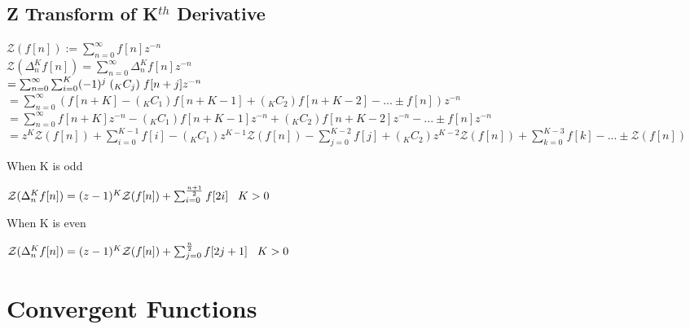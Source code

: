 \documentclass[11pt]{article}
\begin{document}
\subsection{Z Transform of K$^{th}$ Derivative}
\vspace{1mm}
\begin{center}
$
\mathcal{Z}(f[n]) := \sum_{n=0}^{\infty}f[n]z^{-n}
$
\\ \vspace{5mm}
$
\mathcal{Z}(\Delta_n^K f[n]) = \sum_{n=0}^{\infty} \Delta_n^K f[n]z^{-n}
$
\\ \vspace{5mm}
$
= \sum_{n=0}^{\infty} \sum_{i=0}^K (-1)^{j} \hspace{1mm} (_K C _j) \hspace{1mm} f[n + j] z^{-n}
$
\\ \vspace{5mm}
$
= \sum_{n=0}^{\infty} (f[n+K] - (_K C _1) f[n+K-1] +  (_K C _2) f[n+K-2] - ...\pm f[n])z^{-n}
$
\\ \vspace{5mm}
$
= \sum_{n=0}^{\infty} f[n+K]z^{-n} - (_K C _1) f[n+K-1]z^{-n} +  (_K C _2) f[n+K-2]z^{-n} - ...\pm f[n]z^{-n}
$
\\ \vspace{5mm}
$
= z^K \mathcal{Z}(f[n]) +\sum_{i=0}^{K-1} f[i] - (_K C _1)z^{K-1} \mathcal{Z}(f[n]) - \sum_{j=0}^{K-2}f[j] + (_K C _2)z^{K-2} \mathcal{Z}(f[n])+\sum_{k=0}^{K-3}f[k] - ... \pm \mathcal{Z}(f[n])
$
\end{center}
When K is odd
\begin{center}
$
\mathcal{Z}(\Delta_n^K f[n]) = (z-1)^K \mathcal{Z}(f[n]) + \sum_{i=0}^{\frac{n+1}{2}} f[2i] \hspace{3mm} K > 0
$
\end{center}
When K is even
\begin{center}
$
\mathcal{Z}(\Delta_n^K f[n]) = (z-1)^K \mathcal{Z}(f[n]) + \sum_{j=0}^{\frac{n}{2}} f[2j + 1] \hspace{3mm} K > 0
$
\end{center}






\section{Convergent Functions}
\end{document}
